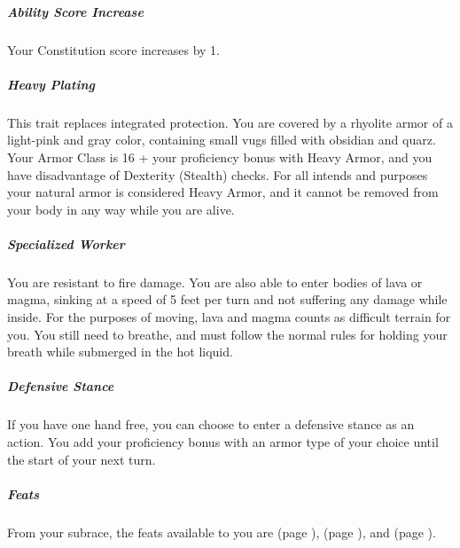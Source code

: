     \subparagraph{Ability Score Increase} Your Constitution score increases by 1.

    \subparagraph{Heavy Plating} This trait replaces integrated protection.
    You are covered by a rhyolite armor of a light-pink and gray color, containing small vugs filled with obsidian and quarz.
    Your Armor Class is 16 + your proficiency bonus with Heavy Armor, and you have disadvantage of Dexterity (Stealth) checks.
    For all intends and purposes your natural armor is considered Heavy Armor, and it cannot be removed from your body in any way while you are alive.

    \subparagraph{Specialized Worker} You are resistant to fire damage.
    You are also able to enter bodies of lava or magma, sinking at a speed of 5 feet per turn and not suffering any damage while inside.
    For the purposes of moving, lava and magma counts as difficult terrain for you.
    You still need to breathe, and must follow the normal rules for holding your breath while submerged in the hot liquid.

    \subparagraph{Defensive Stance} If you have one hand free, you can choose to enter a defensive stance as an action.
    You add your proficiency bonus with an armor type of your choice until the start of your next turn.

    \subparagraph{Feats} From your subrace, the feats available to you are
    \textbf{} (page \pageref{feat::}),
    \textbf{} (page \pageref{feat::}), and
    \textbf{} (page \pageref{feat::}).
